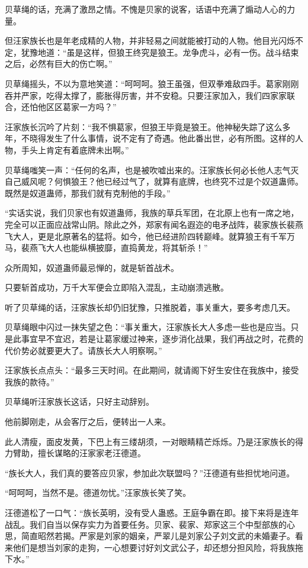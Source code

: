 \begin{this_body}
贝草绳的话，充满了激昂之情。不愧是贝家的说客，话语中充满了煽动人心的力量。

但汪家族长也是年老成精的人物，并非轻易之间就能被打动的人物。他目光闪烁不定，犹豫地道：“虽是这样，但狼王终究是狼王。龙争虎斗，必有一伤。战斗结束之后，必然有巨大的伤亡啊。”

贝草绳摇头，不以为意地笑道：“呵呵呵。狼王虽强，但双拳难敌四手。葛家刚刚吞并严家，吃得太撑了，膨胀得厉害，并不安稳。只要汪家加入，我们四家家联合，还怕他区区葛家一方吗？”

汪家族长沉吟了片刻：“我不惧葛家，但狼王毕竟是狼王。他神秘失踪了这么多年，不晓得发生了什么事情，说不定有了奇遇。他此番出世，必有所图。这样的人物，手头上肯定有着底牌未出啊。”

贝草绳嗤笑一声：“任何的名声，也是被吹嘘出来的。汪家族长何必长他人志气灭自己威风呢？何惧狼王？他已经过气了，就算有底牌，也终究不过是个奴道蛊师。既然是奴道蛊师，那我们就有克制他的手段。”

“实话实说，我们贝家也有奴道蛊师，我族的草兵军团，在北原上也有一席之地，完全可以正面应战常山阴。除此之外，郑家有闻名遐迩的电矛战阵，裴家族长裴燕飞大人，更是北原著名的猛将。如今，他已经进阶四转巅峰。就算狼王有千军万马，裴燕飞大人也能纵横披靡，直捣黄龙，将其斩杀！”

众所周知，奴道蛊师最忌惮的，就是斩首战术。

只要斩首成功，万千大军便会立即陷入混乱，主动崩溃逃散。

听了贝草绳的话，汪家族长却仍旧犹豫，只推脱着，事关重大，要多考虑几天。

贝草绳眼中闪过一抹失望之色：“事关重大，汪家族长大人多虑一些也是应当。只是此事宜早不宜迟，若是让葛家缓过神来，逐步消化战果，我们再战之时，花费的代价势必就要更大了。请族长大人明察啊。”

汪家族长点点头：“最多三天时间。在此期间，就请阁下好生安住在我族中，接受我族的款待。”

贝草绳听汪家族长这话，只好主动辞别。

他前脚刚走，从会客厅之后，便转出一人来。

此人清瘦，面皮发黄，下巴上有三缕胡须，一对眼睛精芒烁烁。乃是汪家族长的得力臂助，擅长谋略的汪家家老汪德道。

“族长大人，我们真的要答应贝家，参加此次联盟吗？”汪德道有些担忧地问道。

“呵呵呵，当然不是。德道勿忧。”汪家族长笑了笑。

汪德道松了一口气：“族长英明，没有受人蛊惑。王庭争霸在即。接下来将是连年战乱。我们自当以保存实力为首要任务。贝家、裴家、郑家这三个中型部族的心思，简直昭然若揭。严家是刘家的姻亲，严翠儿是刘家公子刘文武的未婚妻子。看来他们是想当刘家的走狗，一心想要讨好刘文武公子，却还想分担风险，将我族拖下水。”


\end{this_body}
